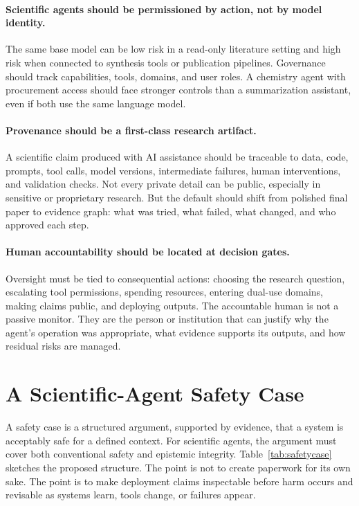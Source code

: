 \documentclass{article}
\begin{document}
\paragraph{Scientific agents should be permissioned by action, not by model identity.} The same base model can be low risk in a read-only literature setting and high risk when connected to synthesis tools or publication pipelines. Governance should track capabilities, tools, domains, and user roles. A chemistry agent with procurement access should face stronger controls than a summarization assistant, even if both use the same language model.

\paragraph{Provenance should be a first-class research artifact.} A scientific claim produced with AI assistance should be traceable to data, code, prompts, tool calls, model versions, intermediate failures, human interventions, and validation checks. Not every private detail can be public, especially in sensitive or proprietary research. But the default should shift from polished final paper to evidence graph: what was tried, what failed, what changed, and who approved each step.

\paragraph{Human accountability should be located at decision gates.} Oversight must be tied to consequential actions: choosing the research question, escalating tool permissions, spending resources, entering dual-use domains, making claims public, and deploying outputs. The accountable human is not a passive monitor. They are the person or institution that can justify why the agent's operation was appropriate, what evidence supports its outputs, and how residual risks are managed.

\section{A Scientific-Agent Safety Case}

A safety case is a structured argument, supported by evidence, that a system is acceptably safe for a defined context. For scientific agents, the argument must cover both conventional safety and epistemic integrity. Table~\ref{tab:safetycase} sketches the proposed structure. The point is not to create paperwork for its own sake. The point is to make deployment claims inspectable before harm occurs and revisable as systems learn, tools change, or failures appear.
\end{document}
